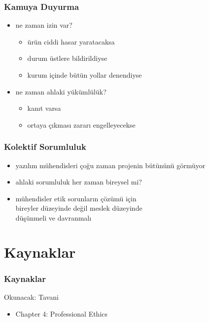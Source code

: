 \documentclass[dvipsnames]{beamer}
\theoremstyle{definition}
\theoremstyle{example}
\theoremstyle{plain}
\begin{document}
\begin{frame}
  \frametitle{Kamuya Duyurma}

  \begin{itemize}
    \item ne zaman izin var?
    \begin{itemize}
      \item ürün ciddi hasar yaratacaksa
      \item durum üstlere bildirildiyse
      \item kurum içinde bütün yollar denendiyse
    \end{itemize}

    \pause
    \medskip
    \item ne zaman ahlaki yükümlülük?
    \begin{itemize}
      \item kanıt varsa
      \item ortaya çıkması zararı engelleyecekse
    \end{itemize}
  \end{itemize}
\end{frame}

\begin{frame}
  \frametitle{Kolektif Sorumluluk}

  \begin{itemize}
    \item yazılım mühendisleri çoğu zaman projenin bütününü görmüyor

    \pause
    \item ahlaki sorumluluk her zaman bireysel mi?

    \pause
    \item mühendisler etik sorunların çözümü için\\
      bireyler düzeyinde değil meslek düzeyinde\\
      düşünmeli ve davranmalı
  \end{itemize}
\end{frame}

\section*{Kaynaklar}

\begin{frame}
  \frametitle{Kaynaklar}

  \begin{block}{Okunacak: Tavani}
    \begin{itemize}
      \item Chapter 4: \alert{Professional Ethics}
    \end{itemize}
  \end{block}
\end{frame}
\end{document}

